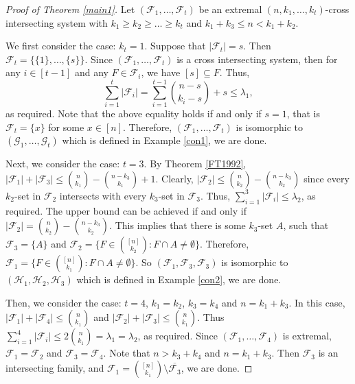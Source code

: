 \documentclass[a4paper,11pt]{article}
\begin{document}
\begin{proof}[Proof of Theorem \ref{main1}]
Let $(\mathcal{F}_1, \dots, \mathcal{F}_t)$ be an extremal $(n, k_1, \dots, k_t)$-cross intersecting system with $k_1\geq k_2\geq\dots\geq k_t$ and $k_1+k_3\leq n <k_1+k_2$.

We  first consider the case: $k_t=1$. Suppose that $|\mathcal{F}_t|=s$. Then $\mathcal{F}_t=\{\{1\}, \dots, \{s\}\}$. Since $(\mathcal{F}_1, \dots, \mathcal{F}_t)$ is a cross intersecting system, then  for any $i\in [t-1]$ and any $F\in \mathcal{F}_i$, we have $[s]\subseteq F$. Thus,
$$\sum_{i=1}^t|\mathcal{F}_i|=\sum_{i=1}^{t-1}{n-s\choose k_i-s}+s\leq\lambda_1,$$
as required.
Note that the above equality holds if and only if $s=1$, that is $\mathcal{F}_t=\{x\}$ for some $x\in [n]$. Therefore, $(\mathcal{F}_1, \dots, \mathcal{F}_t)$ is isomorphic to $(\mathcal{G}_1, \dots, \mathcal{G}_t)$ which is defined in Example \ref{con1}, we are done.

Next, we consider the case: $t=3$. By Theorem \ref{FT1992}, $|\mathcal{F}_1|+|\mathcal{F}_3|\leq {n\choose k_1}-{n-k_3\choose k_1}+1$. Clearly, $|\mathcal{F}_2|\leq {n\choose k_2}-{n-k_3\choose k_2}$ since every $k_2$-set in $\mathcal{F}_2$ intersects with every $k_3$-set in $\mathcal{F}_3$. Thus, $\sum_{i=1}^3|\mathcal{F}_i|\leq \lambda_2$, as required. The upper bound can be achieved if and only if $|\mathcal{F}_2|= {n\choose k_2}-{n-k_3\choose k_2}$. This implies that there is some $k_3$-set $A$, such that $\mathcal{F}_3=\{A\}$ and $\mathcal{F}_2=\{F\in {[n]\choose k_2}: F\cap A\ne \emptyset\}$. Therefore, $\mathcal{F}_1=\{F\in {[n]\choose k_1}: F\cap A\ne \emptyset\}$. So $(\mathcal{F}_1, \mathcal{F}_3, \mathcal{F}_3)$ is isomorphic to $(\mathcal{H}_1, \mathcal{H}_2, \mathcal{H}_3)$ which is defined in Example \ref{con2}, we are done.



Then, we  consider the case: $t=4$, $k_1=k_2$, $k_3=k_4$ and $n=k_1+k_3$. In this case,
$|\mathcal{F}_1|+|\mathcal{F}_4|\leq {n\choose k_1}$ and $|\mathcal{F}_2|+|\mathcal{F}_3|\leq {n\choose k_1}$.
Thus $\sum_{i=1}^4|\mathcal{F}_i|\leq 2{n\choose k_1}=\lambda_1=\lambda_2$, as required.
Since $(\mathcal{F}_1, \dots, \mathcal{F}_4)$
is extremal, $\mathcal{F}_1=\mathcal{F}_2$ and $\mathcal{F}_3=\mathcal{F}_4$. Note that $n>k_3+k_4$ and $n=k_1+k_3$. Then $\mathcal{F}_3$ is an intersecting family, and $\mathcal{F}_1= {[n]\choose k_1}\setminus \overline{\mathcal{F}_3}$, we are done.


\end{proof}
\end{document}
